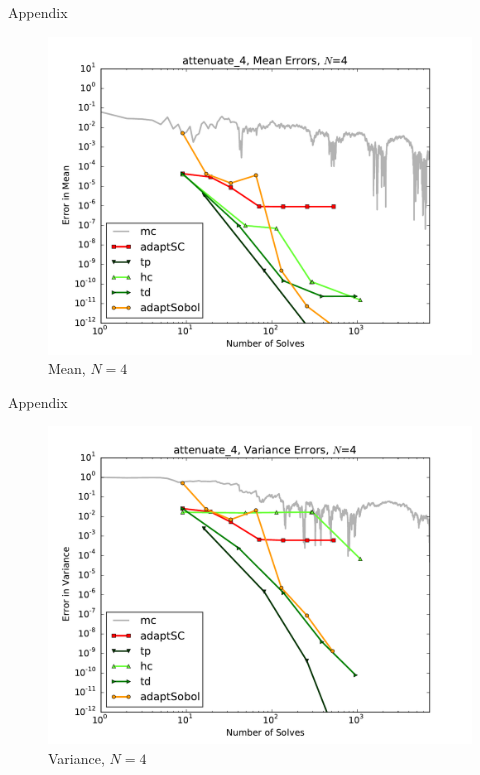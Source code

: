 \documentclass[t,9pt,svgnames]{beamer}
\begin{document}
\begin{frame}{Appendix}
      \begin{figure}
        \centering
        \includegraphics[width=0.8\linewidth]{../../inputs/paul/attenuate_4_mean_errs}
        \caption{Mean, $N=4$}
      \end{figure}
\end{frame}
\begin{frame}{Appendix}
      \begin{figure}
        \centering
        \includegraphics[width=0.8\linewidth]{../../inputs/paul/attenuate_4_variance_errs}
        \caption{Variance, $N=4$}
      \end{figure}
\end{frame}
\end{document}
